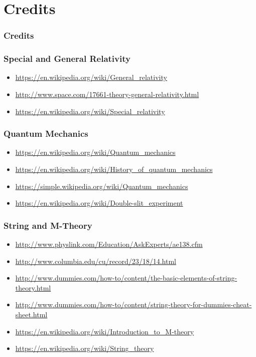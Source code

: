 \documentclass{beamer}
\begin{document}
\section{Credits}

\begin{frame}
\frametitle{Credits}
\end{frame}

\begin{frame}
\frametitle{Special and General Relativity}
\begin{itemize}
\item \url{https://en.wikipedia.org/wiki/General_relativity}
\item \url{http://www.space.com/17661-theory-general-relativity.html}
\item \url{https://en.wikipedia.org/wiki/Special_relativity}
\end{itemize}
\end{frame}

\begin{frame}
\frametitle{Quantum Mechanics}
\begin{itemize}
\item \url{https://en.wikipedia.org/wiki/Quantum_mechanics}
\item \url{https://en.wikipedia.org/wiki/History_of_quantum_mechanics}
\item \url{https://simple.wikipedia.org/wiki/Quantum_mechanics}
\item \url{https://en.wikipedia.org/wiki/Double-slit_experiment}
\end{itemize}
\end{frame}

\begin{frame}
\frametitle{String and M-Theory}
\begin{itemize}
\item \url{http://www.physlink.com/Education/AskExperts/ae138.cfm}
\item \url{http://www.columbia.edu/cu/record/23/18/14.html}
\item \url{http://www.dummies.com/how-to/content/the-basic-elements-of-string-theory.html}
\item \url{http://www.dummies.com/how-to/content/string-theory-for-dummies-cheat-sheet.html}
\item \url{https://en.wikipedia.org/wiki/Introduction_to_M-theory}
\item \url{https://en.wikipedia.org/wiki/String_theory}
\end{itemize}
\end{frame}
\end{document}
